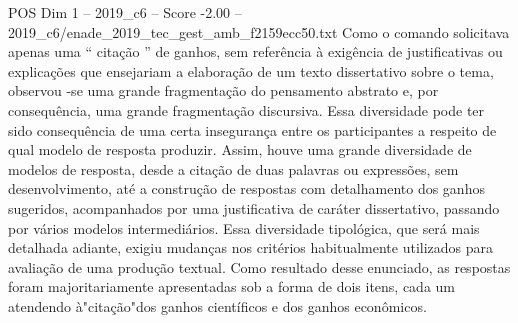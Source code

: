 \begin{textsample}{POS Dim 1 – 2019\_c6 – Score -2.00 – 2019\_c6/enade\_2019\_tec\_gest\_amb\_f2159ecc50.txt}
Como o comando solicitava apenas uma “ citação ” de ganhos, sem referência à exigência de justificativas ou explicações que ensejariam a elaboração de um texto dissertativo sobre o tema, observou -se uma grande fragmentação do pensamento abstrato e, por consequência, uma grande fragmentação discursiva.
Essa diversidade pode ter sido consequência de uma certa insegurança entre os participantes a respeito de qual modelo de resposta produzir.
Assim, houve uma grande diversidade de modelos de resposta, desde a citação de duas palavras ou expressões, sem desenvolvimento, até a construção de respostas com detalhamento dos ganhos sugeridos, acompanhados por uma justificativa de caráter dissertativo, passando por vários modelos intermediários.
Essa diversidade tipológica, que será mais detalhada adiante, exigiu mudanças nos critérios habitualmente utilizados para avaliação de uma produção textual.
Como resultado desse enunciado, as respostas foram majoritariamente apresentadas sob a forma de dois itens, cada um atendendo à"citação"dos ganhos científicos e dos ganhos econômicos.

\end{textsample}
